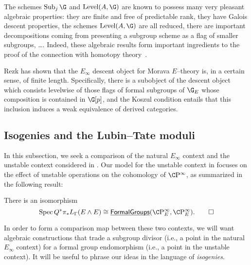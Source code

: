 \begin{remark}
The schemes $\Sub_j \G$ and $\Level(A, \G)$ are known to possess many very pleasant algebraic properties: they are finite and free of predictable rank, they have Galois descent properties, the schemes $\Level(A, \G)$ are all reduced, there are important decompositions coming from presenting a subgroup scheme as a flag of smaller subgroups, \ldots.  Indeed, these algebraic results form important ingredients to the proof of the connection with homotopy theory~\cite[Section 9]{StricklandEthyOfBSigma}.
\end{remark}

\begin{remark}
Rezk has shown that the $E_\infty$ descent object for Morava $E$--theory is, in a certain sense, of finite length.  Specifically, there is a subobject of the descent object which consists levelwise of those flags of formal subgroups of $\G_E$ whose composition is contained in $\G[p]$, and the Koszul condition entails that this inclusion induces a weak equivalence of derived categories.
\end{remark}










\subsection*{Isogenies and the Lubin--Tate moduli}\label{IsogeniesSection}

In this subsection, we seek a comparison of the natural $E_\infty$ context and the unstable context considered in .  Our model for the unstable context in  focuses on the effect of unstable operations on the cohomology of $\CP^\infty$, as summarized in the following result:

\begin{lemma}\label{UnstableEthyCooperations}
There is an isomorphism \[\Spec Q^* \pi_* L_\Gamma(E \sm E) \cong \InternalHom{FormalGroups}(\CP^\infty_E, \CP^\infty_E). \qed\]
\end{lemma}

\noindent In order to form a comparison map between these two contexts, we will want algebraic constructions that trade a subgroup divisor (i.e., a point in the natural $E_\infty$ context) for a formal group endomorphism (i.e., a point in the unstable context).  It will be useful to phrase our ideas in the language of \emph{isogenies}.


